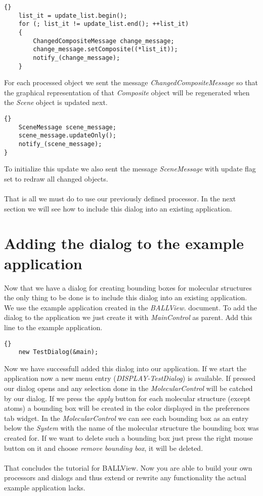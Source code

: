 \begin{lstlisting}{}
	list_it = update_list.begin();
	for (; list_it != update_list.end(); ++list_it)
	{
		ChangedCompositeMessage change_message;
		change_message.setComposite((*list_it));
		notify_(change_message);
	}
\end{lstlisting}

For each processed object we sent the message {\em ChangedCompositeMessage} so
that the graphical representation of that {\em Composite} object will be regenerated
when the {\em Scene} object is updated next.			

\begin{lstlisting}{}
	SceneMessage scene_message;
	scene_message.updateOnly();
	notify_(scene_message);
}
\end{lstlisting}

To initialize this update we also sent the message {\em SceneMessage} with 
update flag set to redraw all changed objects.\\ \\

That is all we must do to use our previously defined processor. In the next section
we will see how to include this dialog into an existing application.



\section{Adding the dialog to the example application}
\label{section:adding_the_dialog}

Now that we have a dialog for creating bounding boxes for molecular structures
the only thing to be done is to include this dialog into an existing application.
We use the example application created in the {\em BALLView.} document.
To add the dialog to the application we just create it with {\em MainControl}
as parent. Add this line to the example application.

\begin{lstlisting}{}
	new TestDialog(&main);
\end{lstlisting}

Now we have successfull added this dialog into our application. If we start the
application now a new menu entry ({\em DISPLAY-TestDialog}) is available. If pressed our dialog opens and
any selection done in the {\em MolecularControl} will be catched by our dialog. If we press
the {\em apply} button for each molecular structure (except atoms) a bounding box
will be created in the color displayed in the preferences tab widget. In the {\em MolecularControl}
we can see each bounding box as an entry below the {\em System} with the name of
the molecular structure the bounding box was created for.
If we want to delete such a bounding box just press the right mouse button on it and
choose {\em remove bounding box}, it will be deleted.\\ \\

That concludes the tutorial for BALLView. Now you are able to build your own
processors and dialogs and thus extend or rewrite any functionality the actual
example application lacks.
